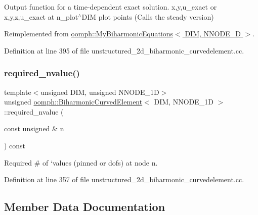 Output function for a time-\/dependent exact solution. x,y,u\+\_\+exact or x,y,z,u\+\_\+exact at n\+\_\+plot$^\wedge$\+D\+IM plot points (Calls the steady version) 



Reimplemented from \hyperlink{classoomph_1_1MyBiharmonicEquations_a95b35b18fac5212ade1a81c26657bcdb}{oomph\+::\+My\+Biharmonic\+Equations$<$ D\+I\+M, N\+N\+O\+D\+E\+\_\+D $>$}.



Definition at line 395 of file unstructured\+\_\+2d\+\_\+biharmonic\+\_\+curvedelement.\+cc.

\mbox{\label{classoomph_1_1BiharmonicCurvedElement_a335d075769ca949eed1d1ab5482a6e46}} 
\subsubsection{\texorpdfstring{required\+\_\+nvalue()}{required\_nvalue()}}
{\footnotesize\ttfamily template$<$unsigned D\+IM, unsigned N\+N\+O\+D\+E\+\_\+1D$>$ \\
unsigned \hyperlink{classoomph_1_1BiharmonicCurvedElement}{oomph\+::\+Biharmonic\+Curved\+Element}$<$ D\+IM, N\+N\+O\+D\+E\+\_\+1D $>$\+::required\+\_\+nvalue (\begin{DoxyParamCaption}\item[{const unsigned \&}]{n }\end{DoxyParamCaption}) const\hspace{0.3cm}{\ttfamily [inline]}}



Required \# of `values\textquotesingle{} (pinned or dofs) at node n. 



Definition at line 357 of file unstructured\+\_\+2d\+\_\+biharmonic\+\_\+curvedelement.\+cc.



\subsection{Member Data Documentation}
\mbox{\label{classoomph_1_1BiharmonicCurvedElement_a67e3e0d226505fa7f24eedab2f9d744c}} 

